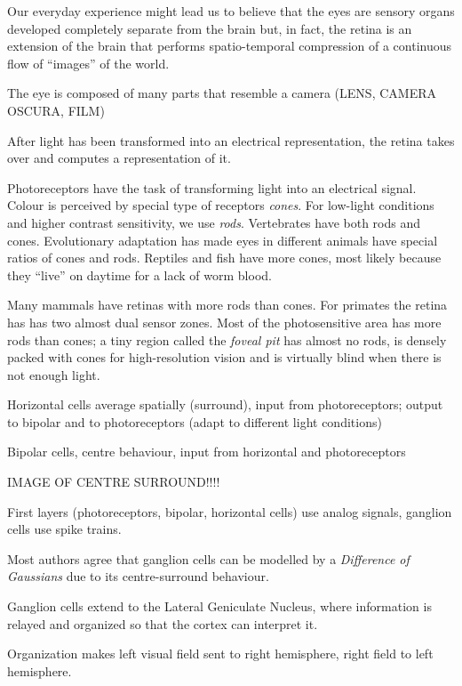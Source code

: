 Our everyday experience might lead us to believe that the eyes are sensory organs developed completely separate from the brain but, in fact, the retina is an extension of the brain that performs spatio-temporal compression of a continuous flow of ``images'' of the world.

The eye is composed of many parts that resemble a camera (LENS, CAMERA OSCURA, FILM)

After light has been transformed into an electrical representation, the retina takes over and computes a representation of it.

Photoreceptors have the task of transforming light into an electrical signal. Colour is perceived by special type of receptors \emph{cones}. For low-light conditions and higher contrast sensitivity, we use \emph{rods}. Vertebrates have both rods and cones. Evolutionary adaptation has made eyes in different animals have special ratios of cones and rods. Reptiles and fish have more cones, most likely because they ``live'' on daytime for a lack of worm blood.

Many mammals have retinas with more rods than cones. For primates the retina has has two almost dual sensor zones. Most of the photosensitive area has more rods than cones; a tiny region called the \emph{foveal pit} has almost no rods, is densely packed with cones for high-resolution vision and is virtually blind when there is not enough light.

Horizontal cells average spatially (surround), input from photoreceptors; output to bipolar and to photoreceptors (adapt to different light conditions)

Bipolar cells, centre behaviour, input from horizontal and photoreceptors

IMAGE OF CENTRE SURROUND!!!!

First layers (photoreceptors, bipolar, horizontal cells) use analog signals, ganglion cells use spike trains.

Most authors agree that ganglion cells can be modelled by a \emph{Difference of Gaussians} due to its centre-surround behaviour.

Ganglion cells extend to the Lateral Geniculate Nucleus, where information is relayed and organized so that the cortex can interpret it. 

Organization makes left visual field sent to right hemisphere, right field to left hemisphere.

